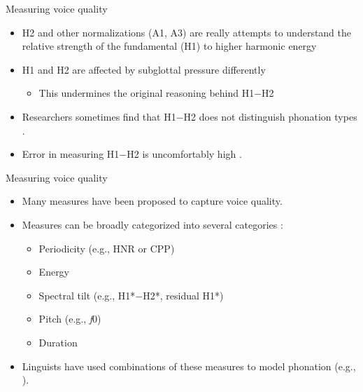 \documentclass[professionalfonts]{beamer}
\begin{document}
\begin{frame}{Measuring voice quality}
  \begin{itemize}
    \item H2 and other normalizations (A1, A3) are really attempts to understand the relative strength of the fundamental (H1) to higher harmonic energy
    \item H1 and H2 are affected by subglottal pressure differently \citep{sundbergObjectiveCharacterizationPhonation2022}
    \begin{itemize}
      \item This undermines the original reasoning behind H1$-$H2
    \end{itemize} 
    \item Researchers sometimes find that H1$-$H2 does not distinguish phonation types \citep[e.g.,][]{espositoVariationContrastivePhonation2010,espositoAcousticElectroglottographicStudy2012,garellekPhoneticsWhiteHmong2023}.
    \item Error in measuring H1$-$H2 is uncomfortably high \citep[e.g.,][]{chaiH1H2AcousticMeasure2022}.
  \end{itemize}
\end{frame}

\begin{frame}{Measuring voice quality}
  \begin{itemize}
    \item Many measures have been proposed to capture voice quality.
    \item Measures can be broadly categorized into several categories \citep{gordonPhonationTypesCrosslinguistic2001}:
    \begin{itemize}
      \item Periodicity (e.g., HNR or CPP)
      \item Energy 
      \item Spectral tilt (e.g., H1*$-$H2*, residual H1*)
      \item Pitch (e.g., \textit{f}0)
      \item Duration 
    \end{itemize}
  \item Linguists have used combinations of these measures to model phonation (e.g., \cite{blankenshipTimingNonmodalPhonation2002,brunelleTonePhonationSoutheast2016,espositoAcousticElectroglottographicStudy2012}).
  \end{itemize}
\end{frame}
\end{document}
